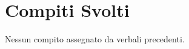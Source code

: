 \documentclass[../verbale-2017-04-20.tex]{subfiles}
\begin{document}
	\section{Compiti Svolti}
		Nessun compito assegnato da verbali precedenti.
\end{document}
